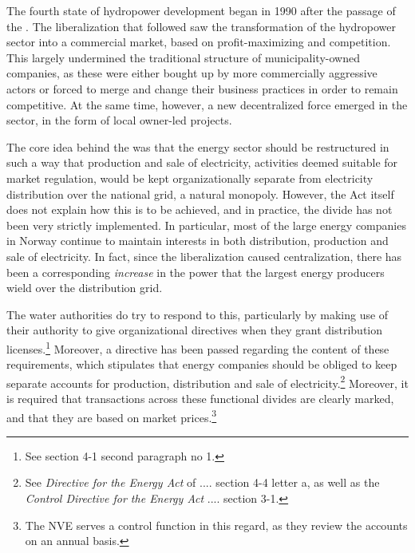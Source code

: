 The fourth state of hydropower development began in 1990 after the passage of the \cite{ea90}. The liberalization that followed saw the transformation of the hydropower sector into a commercial market, based on profit-maximizing and competition. This largely undermined the traditional structure of municipality-owned companies, as these were either bought up by more commercially aggressive actors or forced to merge and change their business practices in order to remain competitive. At the same time, however, a new decentralized force emerged in the sector, in the form of local owner-led projects. 


The core idea behind the \cite{ea90} was that the energy sector should be restructured in such a way that production and sale of electricity, activities deemed suitable for market regulation, would be kept organizationally separate from electricity distribution over the national grid, a natural monopoly. However, the Act itself does not explain how this is to be achieved, and in practice, the divide has not been very strictly implemented. In particular, most of the large energy companies in Norway continue to maintain interests in both distribution, production and sale of electricity. In fact, since the liberalization caused centralization, there has been a corresponding {\it increase} in the power that the largest energy producers wield over the distribution grid.

The water authorities do try to respond to this, particularly by making use of their authority to give organizational directives when they grant distribution licenses.\footnote{See \cite{ea90} section 4-1 second paragraph no 1.} Moreover, a directive has been passed regarding the content of these requirements, which stipulates that energy companies should  be obliged to keep separate accounts for production, distribution and sale of electricity.\footnote{See {\it Directive for the Energy Act} of .... section 4-4 letter a, as well as the {\it Control Directive for the Energy Act}  .... section 3-1.} Moreover, it is required that transactions across these functional divides are clearly marked, and that they are based on market prices.\footnote{The NVE serves a control function in this regard, as they review the accounts on an annual basis.} 

